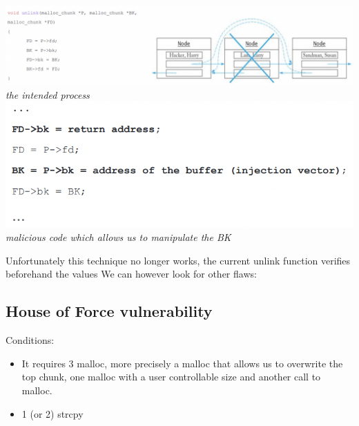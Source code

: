 \documentclass[11pt, oneside]{article}   	%
\begin{document}
\begin{center}
\includegraphics[scale = 0.6]{atk1}
\emph{the intended process}\\
\includegraphics[scale = 0.6]{atk2}\\
\emph{malicious code which allows us to manipulate the BK}
\end{center}
Unfortunately this technique no longer works, the current unlink function verifies beforehand the values
We can however look for other flaws:

\subsection*{House of Force vulnerability}
Conditions:
\begin{itemize}
\item It requires 3 malloc, more precisely a malloc that allows us to overwrite the top chunk, one malloc with a user controllable size and another call to malloc.
\item 1 (or 2) strcpy
\end{itemize}
\end{document}
